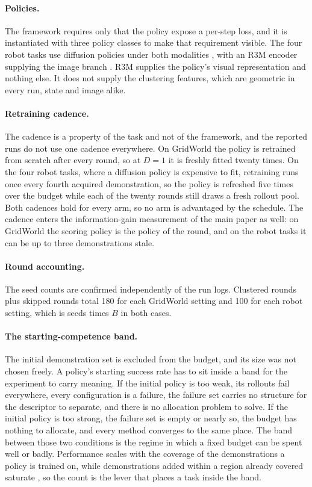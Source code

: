 \documentclass[letterpaper]{article}
\begin{document}
\paragraph{Policies.} The framework requires only that the policy expose a per-step
loss, and it is instantiated with three policy classes to make that requirement
visible. The four robot tasks use diffusion policies
under both modalities \citep{chi2023diffusionpolicy}, with an R3M encoder supplying the
image branch \citep{nair2022r3m}. R3M supplies the policy's visual representation and
nothing else. It does not supply the clustering features, which are geometric in every
run, state and image alike.

\paragraph{Retraining cadence.} The cadence is a property of the task and not of the
framework, and the reported runs do not use one cadence everywhere. On GridWorld the
policy is retrained from scratch after every round, so at $D = 1$ it is freshly fitted
twenty times. On the four robot tasks, where a diffusion policy is expensive to fit,
retraining runs once every fourth acquired demonstration, so the policy is refreshed
five times over the budget while each of the twenty rounds still draws a fresh rollout
pool. Both cadences hold for every arm, so no arm is
advantaged by the schedule. The cadence enters the information-gain measurement of
the main paper as well: on GridWorld the scoring policy is the policy of the round,
and on the robot tasks it can be up to three demonstrations stale.

\paragraph{Round accounting.} The seed counts are confirmed independently of the run
logs. Clustered rounds plus skipped rounds total 180 for each GridWorld setting and
100 for each robot setting, which is seeds times $B$ in both cases.

\paragraph{The starting-competence band.} The initial demonstration set is excluded
from the budget, and its size was not chosen freely. A policy's starting success rate
has to sit inside a band for the experiment to carry meaning. If the initial policy is
too weak, its rollouts fail everywhere, every configuration is a failure, the failure
set carries no structure for the descriptor to separate, and there is no allocation
problem to solve. If the initial policy is too strong, the failure set is empty or
nearly so, the budget has nothing to allocate, and every method converges to the same
place. The band between those two conditions is the regime in which a fixed budget can
be spent well or badly. Performance scales with the coverage of the
demonstrations a policy is trained on, while demonstrations added within a region
already covered saturate \citep{lin2024datascaling}, so the count is the lever that
places a task inside the band.
\end{document}
